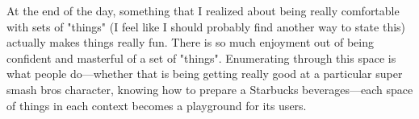 \documentclass[12pt]{article}
\theoremstyle{definition} %
\theoremstyle{plain} %
\begin{document}
At the end of the day, something that I realized about being really comfortable with sets of "things" (I feel like I should probably find another way to state this) actually makes things really fun. There is so much enjoyment out of being confident and masterful of a set of "things". Enumerating through this space is what people do—whether that is being getting really good at a particular super smash bros character, knowing how to prepare a Starbucks beverages—each space of things in each context becomes a playground for its users. 
\end{document}

